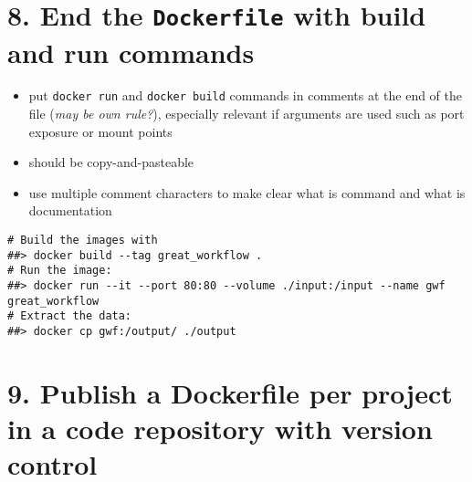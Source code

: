 \documentclass[10pt,letterpaper]{article}
\providecommand{\tightlist}{%
  \setlength{\itemsep}{0pt}\setlength{\parskip}{0pt}}
\begin{document}
\hypertarget{end-the-dockerfile-with-build-and-run-commands}{%
\section{\texorpdfstring{8. End the \texttt{Dockerfile} with build and
run
commands}{8. End the Dockerfile with build and run commands}}\label{end-the-dockerfile-with-build-and-run-commands}}

\begin{itemize}
\tightlist
\item
  put \texttt{docker\ run} and \texttt{docker\ build} commands in
  comments at the end of the file (\emph{may be own rule?}), especially
  relevant if arguments are used such as port exposure or mount points
\item
  should be copy-and-pasteable
\item
  use multiple comment characters to make clear what is command and what
  is documentation
\end{itemize}

\begin{verbatim}
# Build the images with
##> docker build --tag great_workflow .
# Run the image:
##> docker run --it --port 80:80 --volume ./input:/input --name gwf great_workflow
# Extract the data:
##> docker cp gwf:/output/ ./output
\end{verbatim}

\hypertarget{publish-a-dockerfile-per-project-in-a-code-repository-with-version-control}{%
\section*{9. Publish a Dockerfile per project in a code repository with
version
control}\label{publish-a-dockerfile-per-project-in-a-code-repository-with-version-control}}
\end{document}
